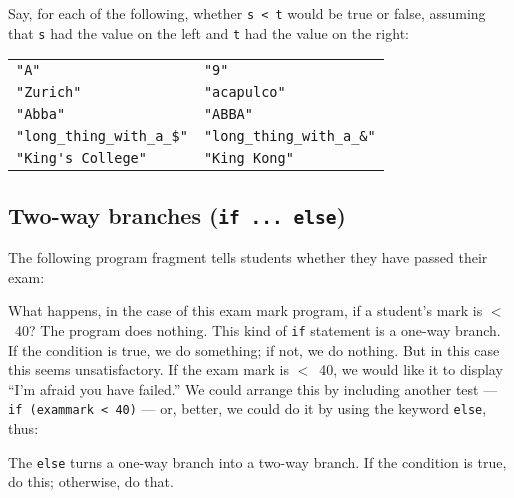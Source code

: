 Say, for each of the following, whether \verb!s < t! would be
true or false, assuming that  \verb!s! had the value on the left and \verb!t!
had the value on the right:

\begin{tabular}{ll}
\verb!"A"! & \verb!"9"!\\
\verb!"Zurich"! & \verb!"acapulco"!\\
\verb!"Abba"! & \verb!"ABBA"!\\
\verb!"long_thing_with_a_$"! & \verb!"long_thing_with_a_&"!\\
\verb!"King's College"! & \verb!"King Kong"!\\
\end{tabular}

\subsection{Two-way branches (\texttt{if ... else})}
\label{sec:two-way-branches}

The following program fragment tells students whether they have passed
their exam: 


What happens, in the case of this exam mark program, if a student's mark is
$<$~40?  The program does nothing.  This kind of \verb!if! statement is a
one-way branch.  If the condition is true, we do something; if not, we do
nothing.  But in this case
this seems unsatisfactory.  If the exam mark is $<$~40, we would like
it to display ``I'm afraid you have failed.''  We could arrange this by
including another test --- \verb!if (exammark < 40)!  --- or, better, we could
do it by using the keyword \verb!else!, thus:


The  \verb!else! turns a one-way branch into a two-way branch.  If the
condition is true, do this; otherwise, do that.





